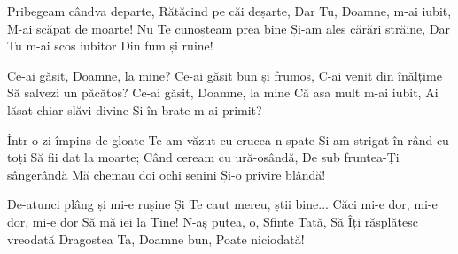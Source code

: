 \beginverse
Pribegeam cândva departe,
Rătăcind pe căi deșarte,
Dar Tu, Doamne, m-ai iubit,
M-ai scăpat de moarte!
Nu Te cunoșteam prea bine
Și-am ales cărări străine,
Dar Tu m-ai scos iubitor
Din fum și ruine!
\endverse

\beginchorus
Ce-ai găsit, Doamne, la mine?
Ce-ai găsit bun și frumos,
C-ai venit din înălțime
Să salvezi un păcătos?
Ce-ai găsit, Doamne, la mine
Că așa mult m-ai iubit,
Ai lăsat chiar slăvi divine
Și în brațe m-ai primit?
\endchorus

\beginverse
Într-o zi împins de gloate
Te-am văzut cu crucea-n spate
Și-am strigat în rând cu toți
Să fii dat la moarte;
Când ceream cu ură-osândă,
De sub fruntea-Ți sângerândă
Mă chemau doi ochi senini
Și-o privire blândă!
\endverse

\beginverse
De-atunci plâng și mi-e rușine
Și Te caut mereu, știi bine...
Căci mi-e dor, mi-e dor, mi-e dor
Să mă iei la Tine!
N-aș putea, o, Sfinte Tată,
Să Îți răsplătesc vreodată
Dragostea Ta, Doamne bun,
Poate niciodată!
\endverse
\endsong